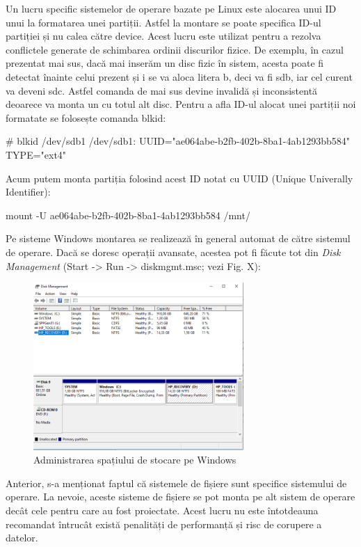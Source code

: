 Un lucru specific sistemelor de operare bazate pe Linux este alocarea unui ID
unui la formatarea unei partiții. Astfel la montare se poate specifica ID-ul
partiției și nu calea către device. Acest lucru este utilizat pentru a rezolva
conflictele generate de schimbarea ordinii discurilor fizice. De exemplu, în
cazul prezentat mai sus, dacă mai inserăm un disc fizic în sistem, acesta poate
fi detectat înainte celui prezent și i se va aloca litera b, deci va fi sdb, iar
cel curent va deveni sdc. Astfel comanda de mai sus devine invalidă și
inconsistentă deoarece va monta un cu totul alt disc. Pentru a afla ID-ul alocat
unei partiții noi formatate se folosește comanda blkid:

\begin{screen}
# blkid /dev/sdb1
/dev/sdb1: UUID="ae064abe-b2fb-402b-8ba1-4ab1293bb584" TYPE="ext4"
\end{screen}

Acum putem monta partiția folosind acest ID notat cu UUID (Unique Univerally
Identifier):

\begin{screen}
mount -U ae064abe-b2fb-402b-8ba1-4ab1293bb584 /mnt/
\end{screen}


Pe sisteme Windows montarea se realizează în general automat de către sistemul
de operare. Dacă se doresc operații avansate, acestea pot fi făcute tot din
\textit{Disk Management} (Start -> Run -> diskmgmt.msc; vezi Fig. X):

\begin{figure}[!htbp]
	\centering
	\includegraphics[width=8cm]{chapters/10-storage/img/admin-img.png}
	\caption{Administrarea spațiului de stocare pe Windows}
	\label{fig:storage-admin}
\end{figure}

Anterior, s-a menționat faptul că sistemele de fișiere sunt specifice sistemului
de operare. La nevoie, aceste sisteme de fișiere se pot monta pe alt sistem de
operare decât cele pentru care au fost proiectate. Acest lucru nu este
întotdeauna recomandat întrucât există penalități de performanță și risc de
corupere a datelor.

